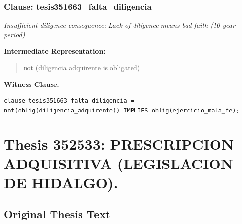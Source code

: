 \documentclass[11pt,a4paper]{article}
\begin{document}
\subsubsection{Clause: tesis351663\_falta\_diligencia}

\textit{Insufficient diligence consequence: Lack of diligence means bad faith (10-year period)}

\textbf{Intermediate Representation:}

\begin{quote}
not (diligencia adquirente is obligated)
\end{quote}

\textbf{Witness Clause:}

\begin{lstlisting}[style=witnessstyle, language=Witness]
clause tesis351663_falta_diligencia = not(oblig(diligencia_adquirente)) IMPLIES oblig(ejercicio_mala_fe);
\end{lstlisting}

\newpage

\section{Thesis 352533: PRESCRIPCION ADQUISITIVA (LEGISLACION DE HIDALGO).}
\label{thesis:352533}

\subsection{Original Thesis Text}
\end{document}
